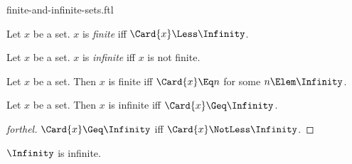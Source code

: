 \documentclass{stex}
\begin{document}
\begin{smodule}{finite-and-infinite-sets.ftl}



\begin{definition*}[forthel,for=finite]
  Let $x$ be a set.
  $x$ is \emph{finite} iff $\Card{x} \Less \Infinity$.
\end{definition*}

\begin{definition*}[forthel,for=infinite]
  Let $x$ be a set.
  $x$ is \emph{infinite} iff $x$ is not finite.
\end{definition*}

\begin{proposition*}[forthel]
  Let $x$ be a set.
  Then $x$ is finite iff $\Card{x} \Eq n$ for some $n \Elem \Infinity$.
\end{proposition*}

\begin{proposition*}[forthel]
  Let $x$ be a set.
  Then $x$ is infinite iff $\Card{x} \Geq \Infinity$.
\end{proposition*}
\begin{proof}[forthel]
  $\Card{x} \Geq \Infinity$ iff $\Card{x} \NotLess \Infinity$.
\end{proof}

\begin{proposition*}[forthel]
  $\Infinity$ is infinite.
\end{proposition*}

\end{smodule}
\end{document}
